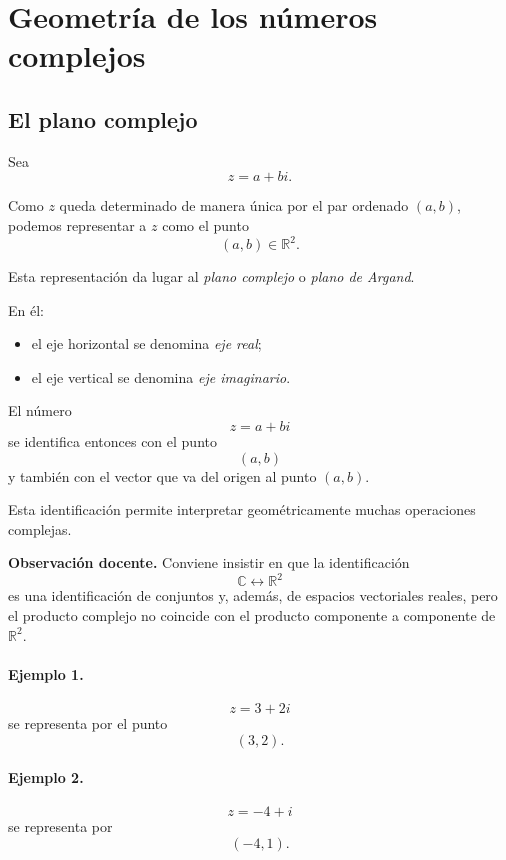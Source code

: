 

\section{Geometría de los números complejos}

\subsection{El plano complejo}

Sea
\[
z=a+bi.
\]

Como $z$ queda determinado de manera única por el par ordenado $(a,b)$,
podemos representar a $z$ como el punto
\[
(a,b)\in\mathbb{R}^2.
\]

Esta representación da lugar al \emph{plano complejo} o \emph{plano de Argand}.

En él:
\begin{itemize}
    \item el eje horizontal se denomina \emph{eje real};
    \item el eje vertical se denomina \emph{eje imaginario}.
\end{itemize}

El número
\[
z=a+bi
\]
se identifica entonces con el punto
\[
(a,b)
\]
y también con el vector que va del origen al punto $(a,b)$.

Esta identificación permite interpretar geométricamente muchas operaciones
complejas.

\textbf{Observación docente.}
Conviene insistir en que la identificación
\[
\mathbb{C}\leftrightarrow\mathbb{R}^2
\]
es una identificación de conjuntos y, además, de espacios vectoriales reales,
pero el producto complejo no coincide con el producto componente a componente
de $\mathbb{R}^2$.

\paragraph{Ejemplo 1.}
\[
z=3+2i
\]
se representa por el punto
\[
(3,2).
\]

\paragraph{Ejemplo 2.}
\[
z=-4+i
\]
se representa por
\[
(-4,1).
\]

